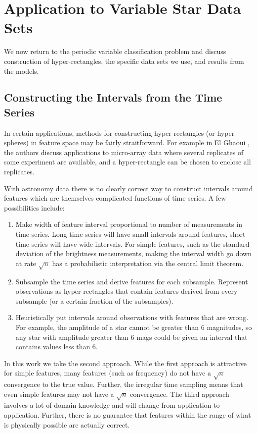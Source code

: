 \documentclass[10pt]{article}
\theoremstyle{definition}
\begin{document}
\section{Application to Variable Star Data Sets}
We now return to the periodic variable classification problem and discuss construction of hyper-rectangles, the specific data sets we use, and results from the models.
\subsection{Constructing the Intervals from the Time Series}
In certain applications, methods for constructing hyper-rectangles (or hyper-spheres) in feature space may be fairly straitforward. For example in El Ghaoui \cite{el2003robust}, the authors discuss applications to micro-array data where several replicates of some experiment are available, and a hyper-rectangle can be chosen to enclose all replicates.

With astronomy data there is no clearly correct way to construct intervals around features which are themselves complicated functions of time series. A few possibilities include:
\begin{enumerate}
\item Make width of feature interval proportional to number of measurements in time series. Long time series will have small intervals around features, short time series will have wide intervals. For simple features, such as the standard deviation of the brightness measurements, making the interval width go down at rate $\sqrt{n}$ has a probabilistic interpretation via the central limit theorem.
\item Subsample the time series and derive features for each subsample. Represent observations as hyper-rectangles that contain features derived from every subsample (or a certain fraction of the subsamples).
\item Heuristically put intervals around observations with features that are wrong. For example, the amplitude of a star cannot be greater than 6 magnitudes, so any star with amplitude greater than 6 mags could be given an interval that contains values less than 6.
\end{enumerate}
In this work we take the second approach. While the first approach is attractive for simple features, many features (such as frequency) do not have a $\sqrt{n}$ convergence to the true value. Further, the irregular time sampling means that even simple features may not have a $\sqrt{n}$ convergence. The third approach involves a lot of domain knowledge and will change from application to application. Further, there is no guarantee that features within the range of what is physically possible are actually correct.
\end{document}
